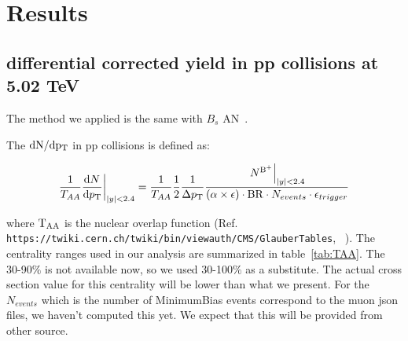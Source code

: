 \section{Results}
\label{sec:results}


\subsection{\pt differential corrected yield in pp collisions at 5.02 TeV}

The method we applied is the same with $B_{s}$ AN~\cite{AN-19-055}.

\iffalse
The $\rm dN/dp_{\mathrm{T}}$ in pp collisions is defined as:

\begin{equation}
  \left.\frac{1}{T_{AA}} \frac{{\rm d}N^{\rm }}{{\rm d}p_{\mathrm{T}}}\right|_{|y|<2.4} =
  \frac{1}{T_{AA}} \frac{1}{2}\frac{1}{\Delta p_{\mathrm{T}}} \frac{\left. N^{\rm \mathrm{B}^{+}}\right|_{|y|<2.4}}{(\alpha\times\epsilon) \cdot{\rm BR} \cdot N_{events} \cdot \epsilon_{trigger}}\,
  \label{eq:ppYield}
\end{equation}

where $\rm T_{AA}$ is the nuclear overlap function (Ref. \verb#https://twiki.cern.ch/twiki/bin/viewauth/CMS/GlauberTables#, ~\cite{AN-15-080}). The centrality ranges used in our analysis are summarized in table~\ref{tab:TAA}. The 30-90$\%$ is not available now, so we used 30-100$\%$ as a substitute. The actual cross section value for this centrality will be lower than what we present.
For the $N_{events}$ which is the number of MinimumBias events correspond to the muon json files, we haven't computed this yet. We expect that this will be provided from other source.

